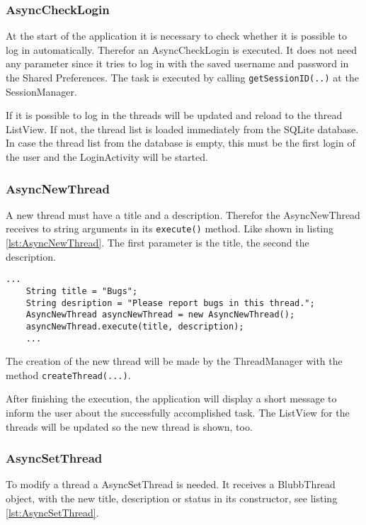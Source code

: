 \documentclass[12pt,a4paper,oneside]{report}
\newcommand{\code}[1]{\lstinline{#1}}
\begin{document}
\subsubsection{AsyncCheckLogin}
\label{AsyncCheckLogin}
At the start of the application it is necessary to check whether it is possible to log in automatically.
Therefor an AsyncCheckLogin is executed. It does not need any parameter since it tries to log in with the saved username and password in the Shared Preferences. 
The task is executed by calling \code{getSessionID(..)} at the SessionManager.


If it is possible to log in the threads will be updated and reload to the thread ListView. If not, the thread list is loaded immediately from the SQLite database. In case the thread list from the database is empty, this must be the first login of the user and the LoginActivity will be started.

\subsubsection{AsyncNewThread}
\label{subsubsec:AsyncNewThread}
A new thread must have a title and a description. Therefor the AsyncNewThread receives to string arguments in its \code{execute()} method. Like shown in listing \ref{lst:AsyncNewThread}. The first parameter is the title, the second the description. 
\lstset{language=java}
\begin{lstlisting}[caption=AsyncNewThread example, label=lst:AsyncNewThread]
	...
	String title = "Bugs";
	String desription = "Please report bugs in this thread.";
	AsyncNewThread asyncNewThread = new AsyncNewThread();
	asyncNewThread.execute(title, description);
	...
\end{lstlisting}
The creation of the new thread will be made by the ThreadManager with the method \code{createThread(...)}.

After finishing the execution, the application will display a short message to inform the user about the successfully accomplished task. The ListView for the threads will be updated so the new thread is shown, too.

\subsubsection{AsyncSetThread}
\label{subsubsec:AsyncSetThread}
To modify a thread a AsyncSetThread is needed. It receives a BlubbThread object, with the new title, description or status in its constructor, see listing \ref{lst:AsyncSetThread}.
\end{document}
